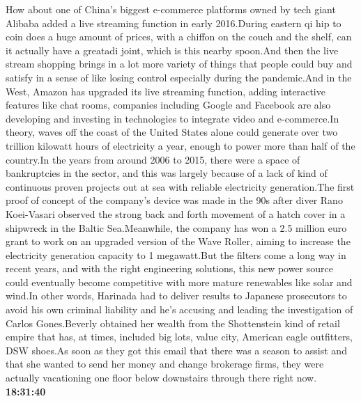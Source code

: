 \documentclass{article}%
\begin{document}
\newline%
How about one of China's biggest e{-}commerce platforms owned by tech giant Alibaba added a live streaming function in early 2016.During eastern qi hip to coin does a huge amount of prices, with a chiffon on the couch and the shelf, can it actually have a greatadi joint, which is this nearby spoon.And then the live stream shopping brings in a lot more variety of things that people could buy and satisfy in a sense of like losing control especially during the pandemic.And in the West, Amazon has upgraded its live streaming function, adding interactive features like chat rooms, companies including Google and Facebook are also developing and investing in technologies to integrate video and e{-}commerce.In theory, waves off the coast of the United States alone could generate over two trillion kilowatt hours of electricity a year, enough to power more than half of the country.In the years from around 2006 to 2015, there were a space of bankruptcies in the sector, and this was largely because of a lack of kind of continuous proven projects out at sea with reliable electricity generation.The first proof of concept of the company's device was made in the 90s after diver Rano Koei{-}Vasari observed the strong back and forth movement of a hatch cover in a shipwreck in the Baltic Sea.Meanwhile, the company has won a 2.5 million euro grant to work on an upgraded version of the Wave Roller, aiming to increase the electricity generation capacity to 1 megawatt.But the filters come a long way in recent years, and with the right engineering solutions, this new power source could eventually become competitive with more mature renewables like solar and wind.In other words, Harinada had to deliver results to Japanese prosecutors to avoid his own criminal liability and he's accusing and leading the investigation of Carlos Gones.Beverly obtained her wealth from the Shottenstein kind of retail empire that has, at times, included big lots, value city, American eagle outfitters, DSW shoes.As soon as they got this email that there was a season to assist and that she wanted to send her money and change brokerage firms, they were actually vacationing one floor below downstairs through there right now.%
\textbf{18:31:40}%
\newline%
\end{document}
